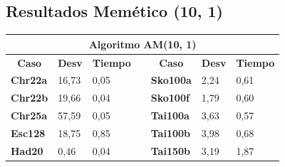 \documentclass[a4paper, 12pt]{article}
\begin{document}
      \subsection{Resultados Memético (10, 1)}
      \begin{table}[H]
\centering
\label{my-label}
\begin{tabular}{|l|l|l|l|l|l|l|}
\hline
\multicolumn{7}{|c|}{\textbf{Algoritmo AM(10, 1)}}                                                                                                                                                                                                                \\ \hline
\multicolumn{1}{|c|}{\textbf{Caso}} & \multicolumn{1}{c|}{\textbf{Desv}} & \multicolumn{1}{c|}{\textbf{Tiempo}} & \multicolumn{1}{c|}{\textbf{}} & \multicolumn{1}{c|}{\textbf{Caso}} & \multicolumn{1}{c|}{\textbf{Desv}} & \multicolumn{1}{c|}{\textbf{Tiempo}} \\ \cline{1-3} \cline{5-7} 
\textbf{Chr22a}                     & 16,73                              & 0,05                                 &                                & \textbf{Sko100a}                   & 2,24                               & 0,61                                 \\ \cline{1-3} \cline{5-7} 
\textbf{Chr22b}                     & 19,66                              & 0,04                                 &                                & \textbf{Sko100f}                   & 1,79                               & 0,60                                 \\ \cline{1-3} \cline{5-7} 
\textbf{Chr25a}                     & 57,59                              & 0,05                                 &                                & \textbf{Tai100a}                   & 3,63                               & 0,57                                 \\ \cline{1-3} \cline{5-7} 
\textbf{Esc128}                     & 18,75                              & 0,85                                 &                                & \textbf{Tai100b}                   & 3,98                               & 0,68                                 \\ \cline{1-3} \cline{5-7} 
\textbf{Had20}                      & 0,46                               & 0,04                                 &                                & \textbf{Tai150b}                   & 3,19                               & 1,87                                 \\ \cline{1-3} \cline{5-7} 

\end{tabular}
\end{table}
\end{document}
